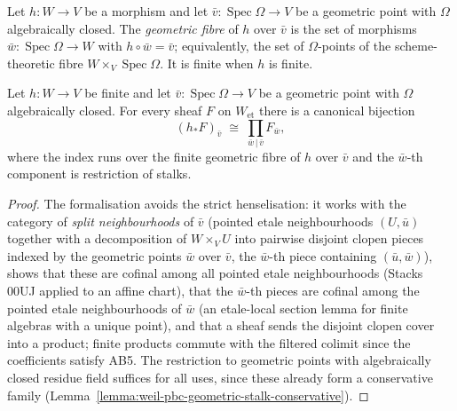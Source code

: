 \begin{definition}
\label{def:weil-pbc-geometric-fibre}
\leanok
Let $h:W\to V$ be a morphism and let $\bar v:\operatorname{Spec}\Omega\to V$ be a
geometric point with $\Omega$ algebraically closed.  The \emph{geometric fibre} of $h$
over $\bar v$ is the set of morphisms $\bar w:\operatorname{Spec}\Omega\to W$ with
$h\circ\bar w=\bar v$; equivalently, the set of $\Omega$-points of the scheme-theoretic
fibre $W\times_V\operatorname{Spec}\Omega$.  It is finite when $h$ is finite.
\end{definition}

\begin{lemma}
\label{lemma:weil-pbc-finite-stalk-formula}
\leanok
Let $h:W\to V$ be finite and let $\bar v:\operatorname{Spec}\Omega\to V$ be a geometric
point with $\Omega$ algebraically closed.  For every sheaf $F$ on $W_{\mathrm{et}}$ there
is a canonical bijection
\[
 (h_*F)_{\bar v}\;\cong\;
 \prod_{\bar w\,|\,\bar v}F_{\bar w},
\]
where the index runs over the finite geometric fibre of $h$ over $\bar v$ and the
$\bar w$-th component is restriction of stalks.
\end{lemma}
\begin{proof}
\leanok

The formalisation avoids the strict henselisation: it works with the category of
\emph{split neighbourhoods} of $\bar v$ (pointed etale neighbourhoods $(U,\bar u)$ together
with a decomposition of $W\times_VU$ into pairwise disjoint clopen pieces indexed by the
geometric points $\bar w$ over $\bar v$, the $\bar w$-th piece containing $(\bar u,\bar w)$), shows
that these are cofinal among all pointed etale neighbourhoods (Stacks 00UJ applied to an affine
chart), that the $\bar w$-th pieces are cofinal among the pointed etale neighbourhoods of
$\bar w$ (an etale-local section lemma for finite algebras with a unique point), and that a
sheaf sends the disjoint clopen cover into a product; finite products commute with the
filtered colimit since the coefficients satisfy AB5.  The restriction to geometric points
with algebraically closed residue field suffices for all uses, since these already form a
conservative family (Lemma~\ref{lemma:weil-pbc-geometric-stalk-conservative}).
\end{proof}

